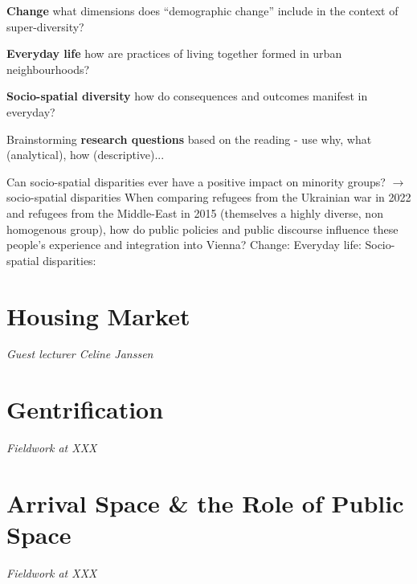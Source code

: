 \documentclass{article}
\begin{document}
\textbf{Change} what dimensions does ``demographic change'' include in the context of super-diversity?

\textbf{Everyday life} how are practices of living together formed in urban neighbourhoods?

\textbf{Socio-spatial diversity} how do consequences and outcomes manifest in everyday?

Brainstorming \textbf{research questions} based on the reading - use why, what (analytical), how (descriptive)...

\begin{outline}
	\1 Can socio-spatial disparities ever have a positive impact on minority groups? $\rightarrow$ socio-spatial disparities
	\1 When comparing refugees from the Ukrainian war in 2022 and refugees from the Middle-East in 2015 (themselves a highly diverse, non homogenous group), how do public policies and public discourse influence these people's experience and integration into Vienna?
		\2 Change:
		\2 Everyday life:
		\2 Socio-spatial disparities:
\end{outline}


\section{Housing Market}

\textit{Guest lecturer Celine Janssen}


\section{Gentrification}

\textit{Fieldwork at XXX}

\section{Arrival Space \& the Role of Public Space}

\textit{Fieldwork at XXX}


\end{document}
